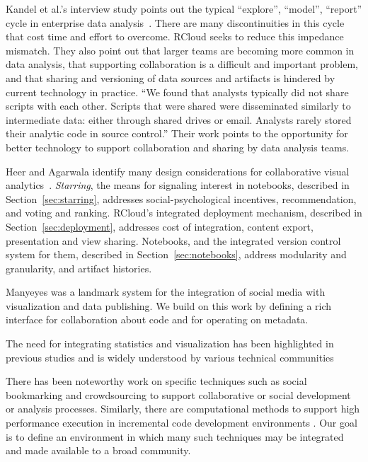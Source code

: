 \documentclass[review,journal]{vgtc}         %
\begin{document}
Kandel et al.'s interview study points out the typical ``explore'',
``model'', ``report'' cycle in enterprise data
analysis~\cite{Kandel:2012:EDA}. There are many discontinuities in
this cycle that cost time and effort to overcome. RCloud seeks to
reduce this impedance mismatch. They also point out that larger teams
are becoming more common in data analysis, that supporting
collaboration is a difficult and important problem, and that sharing
and versioning of data sources and artifacts is hindered by current
technology in practice. ``We found that analysts typically did not
share scripts with each other. Scripts that were shared were
disseminated similarly to intermediate data: either through shared
drives or email. Analysts rarely stored their analytic code in source
control.'' Their work points to the opportunity for better technology
to support collaboration and sharing by data analysis teams.

Heer and Agarwala identify many design considerations for
collaborative visual analytics~\cite{Heer:2008:DCF}. \emph{Starring},
the means for signaling interest in notebooks, described in
Section~\ref{sec:starring}, addresses social-psychological incentives,
recommendation, and voting and ranking. RCloud's integrated deployment
mechanism, described in Section~\ref{sec:deployment}, addresses cost of
integration, content export, presentation and view sharing. Notebooks,
and the integrated version control system for them, described in
Section~\ref{sec:notebooks}, address modularity and granularity, and
artifact histories.

Manyeyes \cite{Viegas:2007:MAS} was a landmark system for the integration
of social media with visualization and data publishing. We build on this
work by defining a rich interface for collaboration about code and for
operating on metadata.

The need for integrating statistics and visualization has been
highlighted in previous studies and is widely understood by
various technical communities \cite{Perer:2008:ISA}

There has been noteworthy work on specific techniques such as
social bookmarking \cite{Millen:2006:DSB} \cite{Heer:2007:VAV}
and crowdsourcing \cite{Fast:2014:ECS} to support collaborative
or social development or analysis processes.
Similarly, there are computational methods to support high
performance execution in incremental code development
environments \cite{Guo:2010:TPI}.
Our goal is to define an environment in which many such
techniques may be integrated and made available to a broad community.
\end{document}
